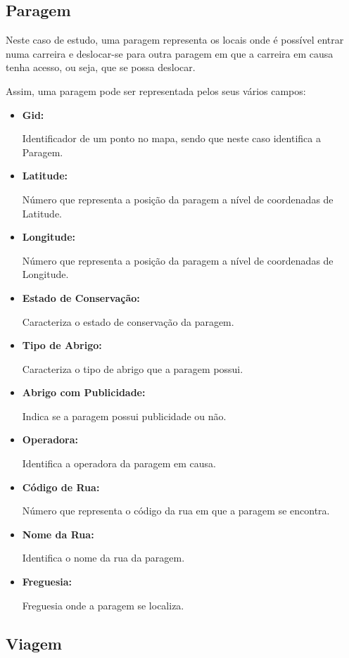 \documentclass[a4paper,12pt]{report}
\begin{document}
\subsection{Paragem}

Neste caso de estudo, uma paragem representa os locais onde é possível entrar numa carreira e deslocar-se para outra paragem em que a carreira em causa tenha acesso, ou seja, que se possa deslocar.
\par Assim, uma paragem pode ser representada pelos seus vários campos:
\begin{itemize}
    \item \textbf{Gid:}
    \par Identificador de um ponto no mapa, sendo que neste caso identifica a Paragem.
    \item \textbf{Latitude:}
    \par Número que representa a posição da paragem a nível de coordenadas de Latitude.
    \item \textbf{Longitude:}
    \par Número que representa a posição da paragem a nível de coordenadas de Longitude.
    \item \textbf{Estado de Conservação:}
    \par Caracteriza o estado de conservação da paragem.
    \item \textbf{Tipo de Abrigo:}
    \par Caracteriza o tipo de abrigo que a paragem possui.
    \item \textbf{Abrigo com Publicidade:}
    \par Indica se a paragem possui publicidade ou não.
    \item \textbf{Operadora:}
    \par Identifica a operadora da paragem em causa.
    \item \textbf{Código de Rua:}
    \par Número que representa o código da rua em que a paragem se encontra.
    \item \textbf{Nome da Rua:}
    \par Identifica o nome da rua da paragem.
    \item \textbf{Freguesia:}
    \par Freguesia onde a paragem se localiza.
\end{itemize}

\subsection{Viagem}
\end{document}
